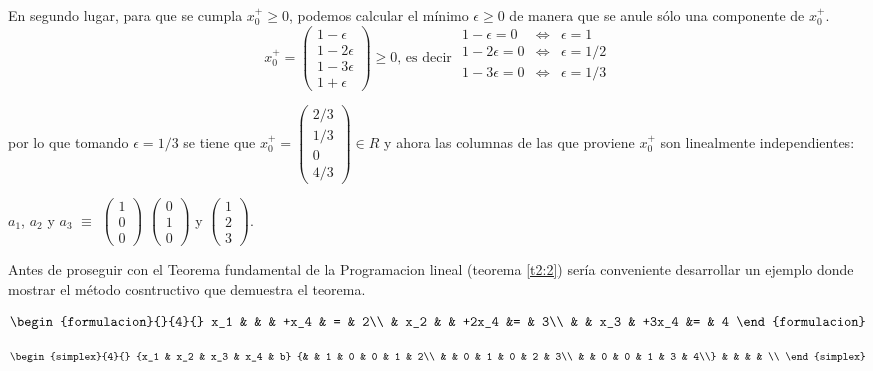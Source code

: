 \begin{solucion}
En segundo lugar, para que se cumpla $x_0^+\ge0$, podemos calcular el mínimo $\epsilon\ge0$ de manera que se anule sólo una componente de $x_0^+$.
$$x_0^+=\left(\begin{array}{l}
1-\epsilon\\
1-2\epsilon\\
1-3\epsilon\\
1+\epsilon
\end{array}\right)\ge0\text{, es decir }
\begin{array}{rcl}
1-\epsilon=0 &\Longleftrightarrow & \epsilon=1\\
1-2\epsilon=0 &\Longleftrightarrow & \epsilon=1/2\\
1-3\epsilon=0 &\Longleftrightarrow & \epsilon=1/3\\
\end{array}$$

por lo que tomando $\epsilon=1/3$ se tiene que
$x_0^+=\left(\begin{array}{c}
2/3\\
1/3\\
0\\
4/3
\end{array}\right)\in R$ y ahora las columnas de las que proviene $x_0^+$ son linealmente independientes: 
\begin{center}
$a_1$, $a_2$ y $a_3$ $\equiv$ $\left(
\begin{array}{c}1\\0\\0\end{array}
\right)$ 
$\left(
\begin{array}{c}0\\1\\0\end{array}
\right)$ y 
$\left(
\begin{array}{c}1\\2\\3\end{array}
\right)$.
\end{center}

\end{solucion}

Antes de proseguir con el Teorema fundamental de la Programacion lineal (teorema \ref{t2:2}) sería conveniente desarrollar un ejemplo donde mostrar el método cosntructivo que demuestra el teorema.

\begin{ejemplo}\label{ej2:5}
$$\begin{formulacion}{}{4}{}
x_1 & &  & +x_4 & = & 2\\
 & x_2 &  & +2x_4 &= & 3\\
  &  & x_3 & +3x_4 &= & 4
\end{formulacion}$$

$$\begin{simplex}{4}{}
{x_1 & x_2 & x_3 & x_4 & b}
{& & 1 & 0 & 0 & 1 & 2\\
 & & 0 & 1 & 0 & 2 & 3\\
 & & 0 & 0 & 1 & 3 & 4\\}
       &   &   &   &   \\
\end{simplex}$$
\end{ejemplo}

